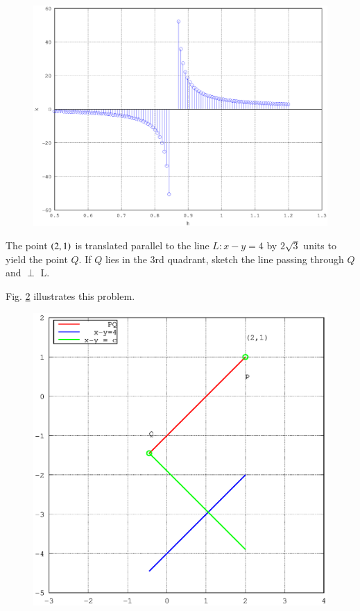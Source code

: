 \documentclass[journal,12pt,twocolumn]{IEEEtran}
\begin{document}
\begin{figure}
\begin{center}
\includegraphics[width=\columnwidth]{./version_2/ee16b1009/ee16b1009}
\end{center}
\label{fig_9}	
\end{figure}
%
\begin{problem}
The point $\left(2,1\right)$ is translated parallel to the line $L:x-y=4$ by $2\sqrt{3}$ units to yield the point $Q$.  If $Q$ lies in the 3rd quadrant, 
sketch the line passing through $Q$ and $\perp$ L.
\end{problem}
%
\solution

Fig. \ref{fig_10} illustrates this problem.

\begin{figure}
\begin{center}
\includegraphics[width=\columnwidth]{./version_2/ee16b1010/ee16b1010}
\end{center}
\label{fig_10}	
\end{figure}
%
\end{document}
